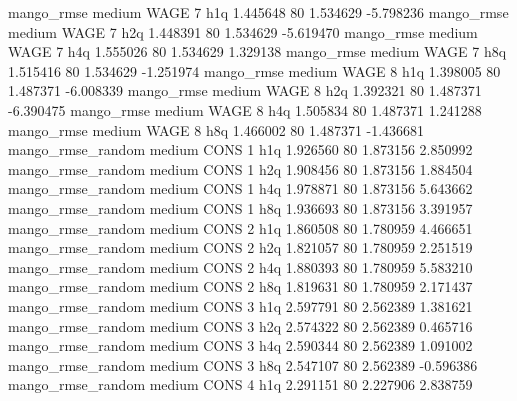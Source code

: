        mango_rmse     medium     WAGE                 7                  h1q  1.445648 80       1.534629          -5.798236
       mango_rmse     medium     WAGE                 7                  h2q  1.448391 80       1.534629          -5.619470
       mango_rmse     medium     WAGE                 7                  h4q  1.555026 80       1.534629           1.329138
       mango_rmse     medium     WAGE                 7                  h8q  1.515416 80       1.534629          -1.251974
       mango_rmse     medium     WAGE                 8                  h1q  1.398005 80       1.487371          -6.008339
       mango_rmse     medium     WAGE                 8                  h2q  1.392321 80       1.487371          -6.390475
       mango_rmse     medium     WAGE                 8                  h4q  1.505834 80       1.487371           1.241288
       mango_rmse     medium     WAGE                 8                  h8q  1.466002 80       1.487371          -1.436681
mango_rmse_random     medium     CONS                 1                  h1q  1.926560 80       1.873156           2.850992
mango_rmse_random     medium     CONS                 1                  h2q  1.908456 80       1.873156           1.884504
mango_rmse_random     medium     CONS                 1                  h4q  1.978871 80       1.873156           5.643662
mango_rmse_random     medium     CONS                 1                  h8q  1.936693 80       1.873156           3.391957
mango_rmse_random     medium     CONS                 2                  h1q  1.860508 80       1.780959           4.466651
mango_rmse_random     medium     CONS                 2                  h2q  1.821057 80       1.780959           2.251519
mango_rmse_random     medium     CONS                 2                  h4q  1.880393 80       1.780959           5.583210
mango_rmse_random     medium     CONS                 2                  h8q  1.819631 80       1.780959           2.171437
mango_rmse_random     medium     CONS                 3                  h1q  2.597791 80       2.562389           1.381621
mango_rmse_random     medium     CONS                 3                  h2q  2.574322 80       2.562389           0.465716
mango_rmse_random     medium     CONS                 3                  h4q  2.590344 80       2.562389           1.091002
mango_rmse_random     medium     CONS                 3                  h8q  2.547107 80       2.562389          -0.596386
mango_rmse_random     medium     CONS                 4                  h1q  2.291151 80       2.227906           2.838759
